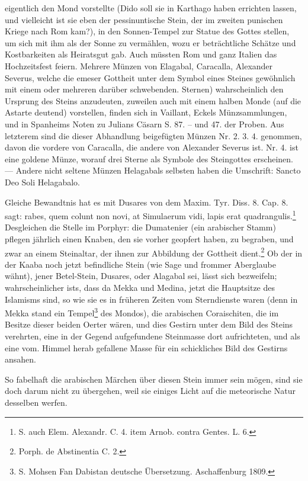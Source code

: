 \documentclass[a4paper, 11pt, oneside, polutonikogreek, german]{article}
\begin{document}
eigentlich den Mond vorstellte (Dido soll sie in Karthago haben errichten lassen, und vielleicht ist sie eben der pessinuntische Stein, der im zweiten punischen Kriege nach Rom kam?), in den Sonnen-Tempel zur Statue des Gottes stellen, um sich mit ihm als der Sonne zu vermählen, wozu er beträchtliche Schätze und Kostbarkeiten als Heiratsgut gab. Auch müssten Rom und ganz Italien das Hochzeitsfest feiern. Mehrere Münzen von Elagabal, Caracalla, Alexander Severus, welche die emeser Gottheit unter dem Symbol eines Steines gewöhnlich mit einem oder mehreren darüber schwebenden. Sternen) wahrscheinlich den Ursprung des Steins anzudeuten, zuweilen auch mit einem halben Monde (auf die Astarte deutend) vorstellen, finden sich in Vaillant, Eckels Münzsammlungen, und in Spanheims Noten zu Julians Cäsarn S. 87. -- und 47. der Proben. Aus letzterem sind die dieser Abhandlung beigefügten Münzen Nr. 2. 3. 4. genommen, davon die vordere von Caracalla, die andere von Alexander Severus ist. Nr. 4. ist eine goldene Münze, worauf drei Sterne als Symbole des Steingottes erscheinen. --- Andere nicht seltene Münzen Helagabals selbsten haben die Umschrift: Sancto Deo Soli Helagabalo.

Gleiche Bewandtnis hat es mit Dusares von dem Maxim. Tyr. Diss. 8. Cap. 8. sagt: rabes, quem colunt non novi, at Simulaerum vidi, lapis erat quadrangulis.\footnote{S. auch Elem. Alexandr. C. 4. item Arnob. contra Gentes. L. 6.} Desgleichen die Stelle im Porphyr: die Dumatenier (ein arabischer Stamm) pflegen jährlich einen Knaben, den sie vorher geopfert haben, zu begraben, und zwar an einem Steinaltar, der ihnen zur Abbildung der Gottheit dient.\footnote{Porph. de Abstinentia C. 2.} Ob der in der Kaaba noch jetzt befindliche Stein (wie Sage und frommer Aberglaube wähnt), jener Betel-Stein, Dusares, oder Alagabal sei, lässt sich bezweifeln; wahrscheinlicher ists, dass da Mekka und Medina, jetzt die Hauptsitze des Islamisms sind, so wie sie es in früheren Zeiten vom Sterndienste waren (denn in Mekka stand ein Tempel\footnote{S. Mohsen Fan Dabistan deutsche Übersetzung. Aschaffenburg 1809.} des Mondos), die arabischen Coraischiten, die im Besitze dieser beiden Oerter wären, und dies Gestirn unter dem Bild des Steins verehrten, eine in der Gegend aufgefundene Steinmasse dort aufrichteten, und als eine vom. Himmel herab gefallene Masse für ein schickliches Bild des Gestirns ansahen.

So fabelhaft die arabischen Märchen über diesen Stein immer sein mögen, sind sie doch darum nicht zu übergehen, weil sie einiges Licht auf die meteorische Natur desselben werfen.
\end{document}

